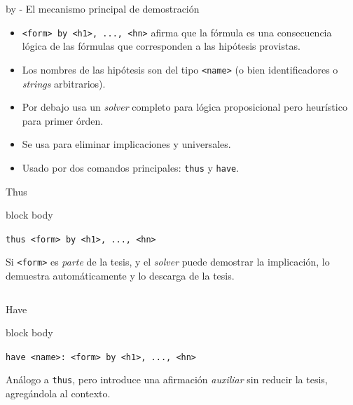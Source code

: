 \documentclass[xcolor={dvipsnames},spanish]{beamer}
\newenvironment{command}
    {
        \begin{beamercolorbox}[sep=8pt,center,shadow=true,rounded=true]{block body}
    }
    {\end{beamercolorbox}}
\begin{document}
\begin{frame}{by - El mecanismo principal de demostración}
    \begin{itemize}
        \item \lstinline{<form> by <h1>, ..., <hn>} afirma que la fórmula es una consecuencia lógica de las fórmulas que corresponden a las hipótesis provistas.
        \item Los nombres de las hipótesis son del tipo \lstinline{<name>} (o bien identificadores o \textit{strings} arbitrarios).
        \item Por debajo usa un \textit{solver} completo para lógica proposicional pero heurístico para primer órden.
        \item Se usa para eliminar implicaciones y universales.
        \item Usado por dos comandos principales: \lstinline{thus} y \lstinline{have}.
    \end{itemize}
\end{frame}


\begin{frame}[fragile]{Thus}
    \begin{command}
    \lstinline{thus <form> by <h1>, ..., <hn>}
    \end{command}

    Si \lstinline{<form>} es \textit{parte} de la tesis, y el \textit{solver} puede demostrar la implicación, lo demuestra automáticamente y lo descarga de la tesis.
    \begin{columns}
        \begin{column}{0.5\textwidth}
            
        \end{column}
        \begin{column}{0.5\textwidth}
            
        \end{column}
    \end{columns}
\end{frame}

\begin{frame}[fragile]{Have}
    \begin{command}
    \lstinline{have <name>: <form> by <h1>, ..., <hn>}
    \end{command}

    Análogo a \lstinline{thus}, pero introduce una afirmación \textit{auxiliar}
    sin reducir la tesis, agregándola al contexto.
    
    
\end{frame}
\end{document}
